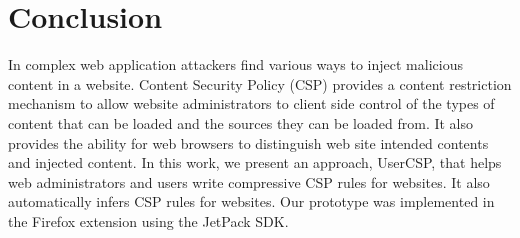 \section{Conclusion}
\label{sec:conclu}

In complex web application attackers find various ways to inject
malicious content in a website. Content Security Policy (CSP) provides
a content restriction mechanism to allow website administrators to
client side control of the types of content that can be loaded and the
sources they can be loaded from. It also provides the ability for web
browsers to distinguish web site intended contents and injected
content.  In this work, we present an approach, UserCSP, that helps
web administrators and users write compressive CSP rules for
websites. It also automatically infers CSP rules for websites. Our
prototype was implemented in the Firefox extension using the JetPack
SDK.

